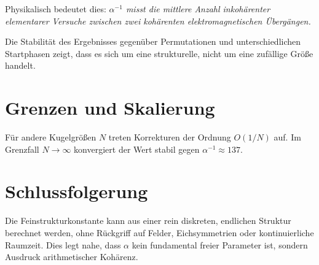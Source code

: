 \documentclass[11pt,a4paper]{article}
\begin{document}
Physikalisch bedeutet dies:
\emph{$\alpha^{-1}$ misst die mittlere Anzahl
inkohärenter elementarer Versuche
zwischen zwei kohärenten elektromagnetischen Übergängen.}

Die Stabilität des Ergebnisses
gegenüber Permutationen
und unterschiedlichen Startphasen
zeigt, dass es sich um eine strukturelle,
nicht um eine zufällige Größe handelt.

\section{Grenzen und Skalierung}

Für andere Kugelgrößen $N$
treten Korrekturen der Ordnung $O(1/N)$ auf.
Im Grenzfall $N \to \infty$
konvergiert der Wert stabil
gegen $\alpha^{-1} \approx 137$.

\section{Schlussfolgerung}

Die Feinstrukturkonstante
kann aus einer rein diskreten,
endlichen Struktur berechnet werden,
ohne Rückgriff auf Felder,
Eichsymmetrien oder kontinuierliche Raumzeit.
Dies legt nahe,
dass $\alpha$ kein fundamental freier Parameter ist,
sondern Ausdruck arithmetischer Kohärenz.
\end{document}
